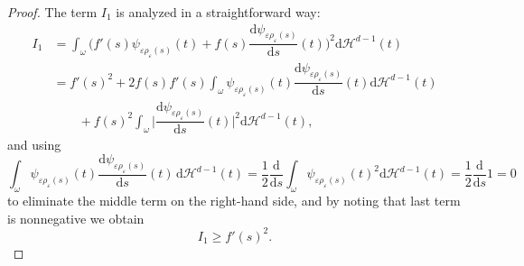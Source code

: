 \documentclass[11pt,oneside,reqno,a4paper]{amsart}
\newcommand{\dd}{\mathrm{d}}
\renewcommand{\H}{\mathcal{H}}
\newcommand{\eps}{\varepsilon}
\theoremstyle{definition}
\begin{document}
\begin{proof}
The term $I_1$ is analyzed in a straightforward way:
\begin{align*}
	I_1&=
	\int_\omega \Big( f'(s)\psi_{\eps \rho_\eps(s)}(t)+f(s)\dfrac{\dd \psi_{\eps\rho_\eps(s)}}{\dd s}(t)\Big)^2\dd\H^{d-1}(t)\\
	&=f'(s)^2+2f(s)f'(s)\int_\omega \psi_{\eps \rho_\eps(s)}(t)\dfrac{\dd \psi_{\eps\rho_\eps(s)}}{\dd s}(t)\dd\H^{d-1}(t)\\
	&\qquad+f(s)^2\int_\omega \Big|\dfrac{\dd \psi_{\eps\rho_\eps(s)}}{\dd s}(t)\Big|^2\dd\H^{d-1}(t),
\end{align*}
and using 
\[
\int_\omega \psi_{\eps \rho_\eps(s)}(t)\dfrac{\dd \psi_{\eps\rho_\eps(s)}}{\dd s}(t)\,\dd\H^{d-1}(t)
=\dfrac{1}{2}\dfrac{\dd}{\dd s}\int_\omega \psi_{\eps \rho_\eps(s)}(t)^2\dd\H^{d-1}(t)
=\dfrac{1}{2}\dfrac{\dd}{\dd s} 1=0
\]
to eliminate the middle term on the right-hand side, and by noting that last term is nonnegative we obtain
\begin{equation}
	\label{eq-i1}
	I_1\ge f'(s)^2.
\end{equation}	


\end{proof}
\end{document}
